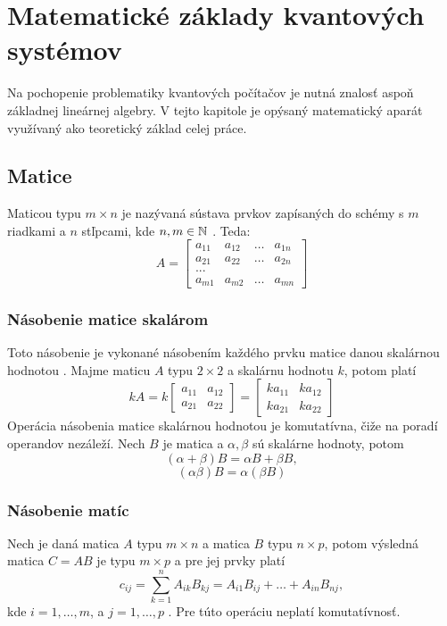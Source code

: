 
\chapter{Matematické základy kvantových systémov}

Na pochopenie problematiky kvantových počítačov je nutná znalosť aspoň základnej lineárnej algebry.
V tejto kapitole je opýsaný matematický aparát využívaný ako teoretický základ celej práce.

\section{Matice}

Maticou typu \(m \times n\) je nazývaná sústava prvkov zapísaných do schémy s \(m\) riadkami a \(n\) stľpcami, kde \(n,m \in \mathbb{N}\) \cite{Ste18}.
Teda:
\[
A = \begin{bmatrix}
		a_{11} & a_{12} & \dots & a_{1n} \\
		a_{21} & a_{22} & \dots & a_{2n} \\
		{...}							\\
		a_{m1} & a_{m2} & \dots & a_{mn}
     \end{bmatrix}
\]

\subsection{Násobenie matice skalárom}
Toto násobenie je vykonané násobením každého prvku matice danou skalárnou hodnotou \cite{Ste18}.
Majme maticu \(A\) typu \(2 \times 2\) a skalárnu hodnotu \(k\), potom platí
\[
kA = k \begin{bmatrix}
		 a_{11} & a_{12} \\
		 a_{21} & a_{22}
       \end{bmatrix}
= \begin{bmatrix}
	ka_{11} & ka_{12} \\
	ka_{21} & ka_{22}
  \end{bmatrix}
\]
Operácia násobenia matice skalárnou hodnotou je komutatívna, čiže na poradí operandov nezáleží.
Nech \(B\) je matica a \(\alpha, \beta\) sú skalárne hodnoty, potom
\[(\alpha + \beta)B = \alpha B + \beta B,\] \[(\alpha \beta)B = \alpha(\beta B)\]

\subsection{Násobenie matíc}
Nech je daná matica \(A\) typu \(m \times n\) a matica \(B\) typu \(n \times p\), potom výsledná matica \(C = AB\) je typu \(m \times p\) a pre jej prvky platí
\[c_{ij} = \sum_{k=1}^{n} A_{ik}B_{kj} = A_{i1}B_{ij} + \dots + A_{in}B_{nj},\]
kde \(i = 1, \dots ,m\), a \(j = 1, \dots , p\) \cite{Ste18}.
Pre túto operáciu neplatí komutatívnosť.


